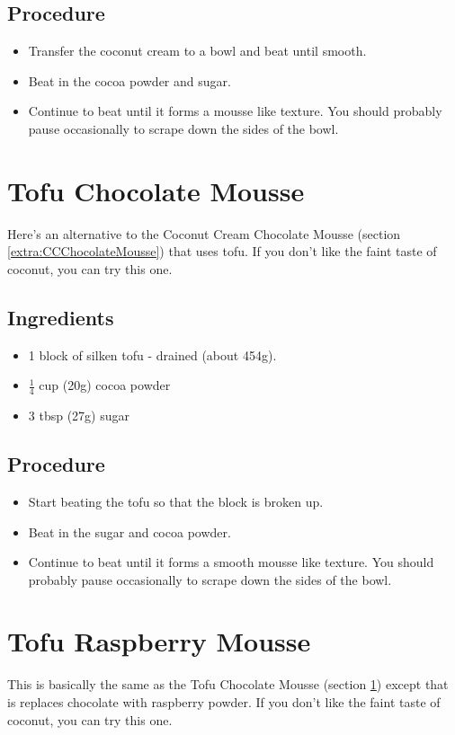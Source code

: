 \documentclass[10pt, openany]{book}
\begin{document}
\subsection{Procedure}
\begin{itemize}
  \item Transfer the coconut cream to a bowl and beat until smooth.
  \item Beat in the cocoa powder and sugar.
  \item Continue to beat until it forms a mousse like texture.  You should probably pause occasionally to scrape down the sides of the bowl.
\end{itemize}

\section{Tofu Chocolate Mousse}
\label{extra:TofuChocolateMousse}
Here's an alternative to the Coconut Cream Chocolate Mousse (section \ref{extra:CCChocolateMousse}) that uses tofu.  If you don't like the faint taste of coconut, you can try this one.
\subsection{Ingredients}
\begin{itemize}
  \item 1 block of silken tofu - drained (about 454g).
  \item $\frac{1}{4}$ cup (20g) cocoa powder
  \item 3 tbsp (27g) sugar
\end{itemize}
\subsection{Procedure}
\begin{itemize}
  \item Start beating the tofu so that the block is broken up.
  \item Beat in the sugar and cocoa powder.
  \item Continue to beat until it forms a smooth mousse like texture.  You should probably pause occasionally to scrape down the sides of the bowl.
\end{itemize}

\section{Tofu Raspberry Mousse}
\label{extra:TofuRaspberryMousse}
This is basically the same as the Tofu Chocolate Mousse (section \ref{extra:TofuChocolateMousse}) except that is replaces chocolate with raspberry powder.  If you don't like the faint taste of coconut, you can try this one.
\end{document}
